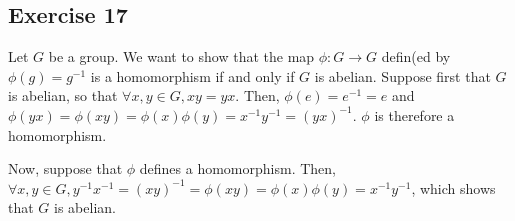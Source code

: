 \subsection*{Exercise 17}
Let $G$ be a group. We want to show that the map $\phi: G \rightarrow G$ defin(ed by $\phi(g) = g^{-1}$ is a homomorphism if and only if $G$ is abelian. Suppose first that $G$ is abelian, so that $\forall x,y \in G, xy = yx$. Then, $\phi(e) = e^{-1} = e$ and $\phi(yx) = \phi(xy) = \phi(x)\phi(y) = x^{-1}y^{-1} = (yx)^{-1}$. $\phi$ is therefore a homomorphism.

Now, suppose that $\phi$ defines a homomorphism. Then, $\forall x,y \in G, y^{-1}x^{-1} = (xy)^{-1} = \phi(xy) = \phi(x)\phi(y) = x^{-1}y^{-1}$, which shows that $G$ is abelian.